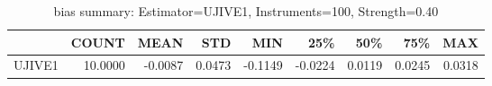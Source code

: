 \begin{table}[ht]
\centering
\caption{bias summary: Estimator=UJIVE1, Instruments=100, Strength=0.40}
\begin{tabular}{lrrrrrrrr}
\toprule
 & COUNT & MEAN & STD & MIN & 25\% & 50\% & 75\% & MAX \\
\midrule
UJIVE1 & 10.0000 & -0.0087 & 0.0473 & -0.1149 & -0.0224 & 0.0119 & 0.0245 & 0.0318 \\
\bottomrule
\end{tabular}
\end{table}
